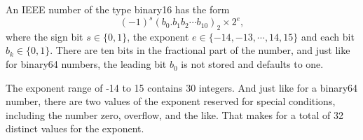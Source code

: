 \documentclass[12pt,fleqn,answers]{exam}
\begin{document}
\begin{questions}  

\question An IEEE number of the type binary16 has the form
\begin{equation*}
   (-1)^s (b_0 . b_1 b_2 \cdots b_{10})_2 \times 2^e,
\end{equation*}
where the sign bit $s \in \{0,1 \}$,  the exponent $e \in \{-14, -13, \cdots, 14, 15 \}$ and each bit $b_k \in \{0,1\}$.
There are ten bits in the fractional part of the number, and just like for binary64 numbers,  the leading bit $b_0$ is
not stored and defaults to one. 

\quad The exponent range of -14 to 15 contains 30 integers. And just like for a binary64 number, there are two values  of the exponent reserved for special conditions, including the number zero, overflow, and the like. That makes for a total  of 32 distinct values for the exponent. 

\end{questions}
\end{document}

